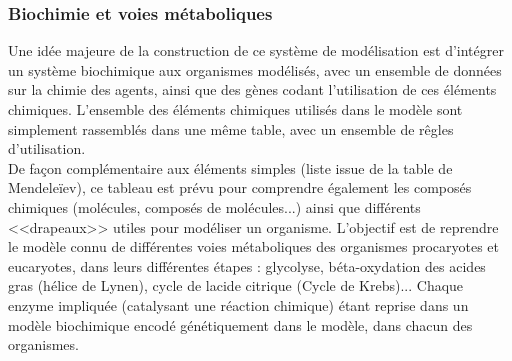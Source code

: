 \documentclass[11pt,twoside,a4paper]{article}
\begin{document}

\subsubsection{Biochimie et voies m{\'e}taboliques}

Une id{\'e}e majeure de la construction de ce syst{\`e}me de mod{\'e}lisation est d'int{\'e}grer un syst{\`e}me biochimique aux organismes mod{\'e}lis{\'e}s, avec un ensemble de donn{\'e}es sur la chimie des agents, ainsi que des g{\`e}nes codant l'utilisation de ces {\'e}l{\'e}ments chimiques. L'ensemble des {\'e}l{\'e}ments chimiques utilis{\'e}s dans le mod{\`e}le sont simplement rassembl{\'e}s dans une m{\^e}me table, avec un ensemble de r{\^e}gles d'utilisation.~\\

De fa\c{c}on compl{\'e}mentaire aux {\'e}l{\'e}ments simples (liste issue de la table de Mendele{\"i}ev), ce tableau est pr{\'e}vu pour comprendre {\'e}galement les compos{\'e}s chimiques (mol{\'e}cules, compos{\'e}s de mol{\'e}cules...) ainsi que diff{\'e}rents <<drapeaux>> utiles pour mod{\'e}liser un organisme. L'objectif est de reprendre le mod{\`e}le connu de diff{\'e}rentes voies m{\'e}taboliques des organismes procaryotes et eucaryotes, dans leurs diff{\'e}rentes {\'e}tapes : glycolyse, b{\'e}ta-oxydation des acides gras (h{\'e}lice de Lynen), cycle de lacide citrique (Cycle de Krebs)... Chaque enzyme impliqu{\'e}e (catalysant une r{\'e}action chimique) {\'e}tant reprise dans un mod{\`e}le biochimique encod{\'e} g{\'e}n{\'e}tiquement dans le mod{\`e}le, dans chacun des organismes.~\\
\end{document}
